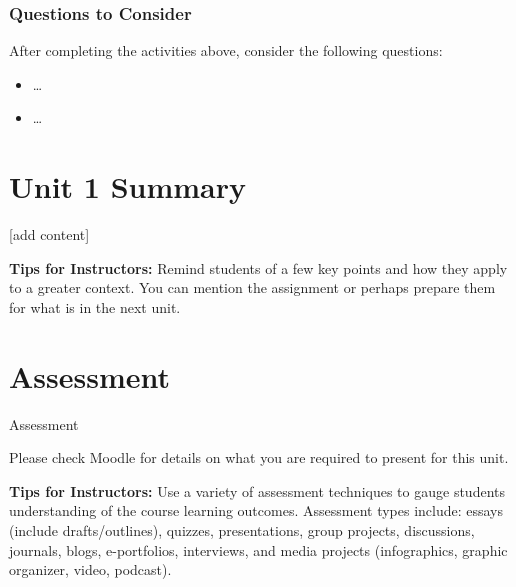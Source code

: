 \documentclass[
]{book}
\providecommand{\tightlist}{%
  \setlength{\itemsep}{0pt}\setlength{\parskip}{0pt}}
\begin{document}
\hypertarget{questions-to-consider-3}{%
\subsubsection*{Questions to Consider}\label{questions-to-consider-3}}

After completing the activities above, consider the following questions:

\begin{itemize}
\tightlist
\item
  \ldots{}\\
\item
  \ldots{}
\end{itemize}

\hypertarget{unit-1-summary}{%
\section*{Unit 1 Summary}\label{unit-1-summary}}

{[}add content{]}

\begin{feedback}
\textbf{Tips for Instructors:}
Remind students of a few key points and how they apply to a greater context. You can mention the assignment or perhaps prepare them for what is in the next unit.
\end{feedback}

\hypertarget{assessment-1}{%
\section*{Assessment}\label{assessment-1}}

\begin{assessment}
{Assessment}

Please check Moodle for details on what you are required to present for this unit.
\end{assessment}

\begin{feedback}
\textbf{Tips for Instructors:}
Use a variety of assessment techniques to gauge students understanding of the course learning outcomes. Assessment types include: essays (include drafts/outlines), quizzes, presentations, group projects, discussions, journals, blogs, e-portfolios, interviews, and media projects (infographics, graphic organizer, video, podcast).
\end{feedback}
\end{document}
